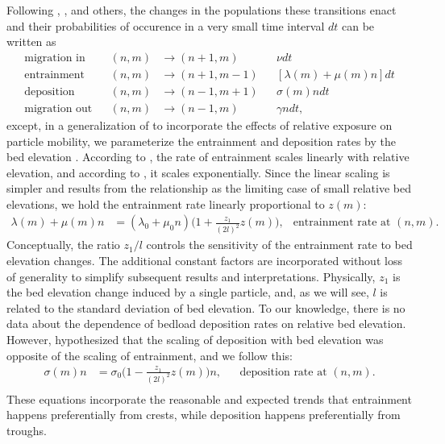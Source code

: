 \documentclass{article}
\begin{document}
Following \citet{Ancey2008}, \citet{Turowski2009}, \citet{Ancey2014a} and others, the changes in the populations these transitions enact and their probabilities of occurence in a very small time interval $dt$ can be written as
\begin{align}
\text{migration in}&   & (n,m) &\rightarrow (n+1,m)   &  &\nu dt\\
\text{entrainment}&    & (n,m) &\rightarrow (n+1,m-1) &  &[\lambda(m) + \mu(m) n]dt\\
\text{deposition}&     & (n,m) &\rightarrow (n-1,m+1) &  &\sigma(m) n dt\\
\text{migration out}&  & (n,m) &\rightarrow (n-1,m)   &  &\gamma n dt,
\end{align}
except, in a generalization of \citet{Ancey2008} to incorporate the effects of relative exposure on particle mobility, we parameterize the entrainment and deposition rates by the bed elevation \citep{Sawai1987, Wong2007}.
According to \citet{Sawai1987}, the rate of entrainment scales linearly with relative elevation, and according to \citet{Wong2007}, it scales exponentially. 
Since the linear scaling is simpler and results from the \citet{Wong2007} relationship as the limiting case of small relative bed elevations, we hold the entrainment rate linearly proportional to $z(m)$:
\begin{align}
\lambda(m) + \mu(m) n &= (\lambda_0 + \mu_0 n)\Big(1+\frac{z_1 }{(2l)^2 }z(m)\Big), & \text{entrainment rate at } (n,m). 
\end{align} 
Conceptually, the ratio $z_1/l$ controls the sensitivity of the entrainment rate to bed elevation changes. 
The additional constant factors are incorporated without loss of generality to simplify subsequent results and interpretations. 
Physically, $z_1$ is the bed elevation change induced by a single particle, and, as we will see, $l$ is related to the standard deviation of bed elevation. 
To our knowledge, there is no data about the dependence of bedload deposition rates on relative bed elevation. 
However, \citet{Wong2007} hypothesized that the scaling of deposition with bed elevation was opposite of the scaling of entrainment, and we follow this: 
\begin{align}
\sigma(m)n &= \sigma_0\Big(1-\frac{z_1}{(2l)^2  }z(m)\Big)n, & &\text{deposition rate at } (n,m).\\
\end{align}
These equations incorporate the reasonable and expected trends that entrainment happens preferentially from crests, while deposition happens preferentially from troughs. 
\end{document}
